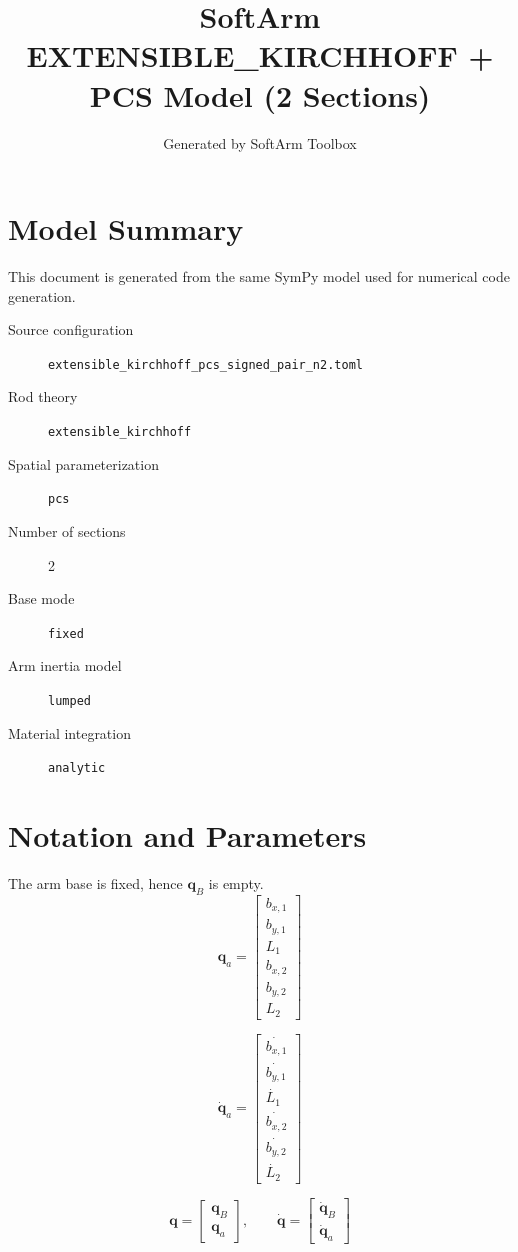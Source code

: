 \documentclass[11pt]{article}
\title{SoftArm EXTENSIBLE\_KIRCHHOFF + PCS Model (2 Sections)}
\author{Generated by SoftArm Toolbox}
\date{}
\begin{document}
\maketitle

\section{Model Summary}
This document is generated from the same SymPy model used for numerical code generation.
\begin{description}
\item[Source configuration] \texttt{extensible\_kirchhoff\_pcs\_signed\_pair\_n2.toml}
\item[Rod theory] \texttt{extensible\_kirchhoff}
\item[Spatial parameterization] \texttt{pcs}
\item[Number of sections] 2
\item[Base mode] \texttt{fixed}
\item[Arm inertia model] \texttt{lumped}
\item[Material integration] \texttt{analytic}
\end{description}

\section{Notation and Parameters}
The arm base is fixed, hence $\boldsymbol q_B$ is empty.
\begin{equation}
\boldsymbol q_a=\begin{bmatrix}b_{x,1}\\b_{y,1}\\L_{1}\\b_{x,2}\\b_{y,2}\\L_{2}\end{bmatrix}
\end{equation}

\begin{equation}
\dot{\boldsymbol q}_a=\begin{bmatrix}\dot{b_{x,1}}\\\dot{b_{y,1}}\\\dot{L_{1}}\\\dot{b_{x,2}}\\\dot{b_{y,2}}\\\dot{L_{2}}\end{bmatrix}
\end{equation}

\begin{equation}
\boldsymbol q=\begin{bmatrix}\boldsymbol q_B\\\boldsymbol q_a\end{bmatrix},\qquad \dot{\boldsymbol q}=\begin{bmatrix}\dot{\boldsymbol q}_B\\\dot{\boldsymbol q}_a\end{bmatrix}
\end{equation}
\end{document}
